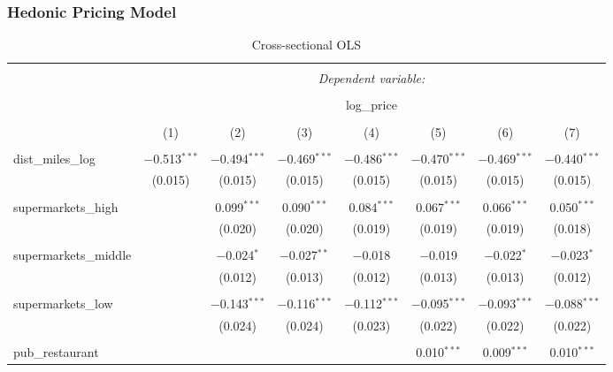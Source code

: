 \documentclass{article}
\begin{document}
\subsubsection{Hedonic Pricing Model} \label{subsubsection:result:hedonic}
\begin{table}[t] \centering 
  \caption{Cross-sectional OLS} 
  \label{table:hedonic} 
\small 
\begin{tabular}{@{\extracolsep{-10pt}}lccccccc} 
\\[-1.8ex]\hline 
\hline \\[-1.8ex] 
 & \multicolumn{7}{c}{\textit{Dependent variable:}} \\ 
\cline{2-8} 
\\[-1.8ex] & \multicolumn{7}{c}{log\_price} \\ 
\\[-1.8ex] & (1) & (2) & (3) & (4) & (5) & (6) & (7)\\ 
\hline \\[-1.8ex] 
 dist\_miles\_log & $-$0.513$^{***}$ & $-$0.494$^{***}$ & $-$0.469$^{***}$ & $-$0.486$^{***}$ & $-$0.470$^{***}$ & $-$0.469$^{***}$ & $-$0.440$^{***}$ \\ 
  & (0.015) & (0.015) & (0.015) & (0.015) & (0.015) & (0.015) & (0.015) \\ 
  & & & & & & & \\ 
 supermarkets\_high &  & 0.099$^{***}$ & 0.090$^{***}$ & 0.084$^{***}$ & 0.067$^{***}$ & 0.066$^{***}$ & 0.050$^{***}$ \\ 
  &  & (0.020) & (0.020) & (0.019) & (0.019) & (0.019) & (0.018) \\ 
  & & & & & & & \\ 
 supermarkets\_middle &  & $-$0.024$^{*}$ & $-$0.027$^{**}$ & $-$0.018 & $-$0.019 & $-$0.022$^{*}$ & $-$0.023$^{*}$ \\ 
  &  & (0.012) & (0.013) & (0.012) & (0.013) & (0.013) & (0.012) \\ 
  & & & & & & & \\ 
 supermarkets\_low &  & $-$0.143$^{***}$ & $-$0.116$^{***}$ & $-$0.112$^{***}$ & $-$0.095$^{***}$ & $-$0.093$^{***}$ & $-$0.088$^{***}$ \\ 
  &  & (0.024) & (0.024) & (0.023) & (0.022) & (0.022) & (0.022) \\ 
  & & & & & & & \\ 
 pub\_restaurant &  &  &  &  & 0.010$^{***}$ & 0.009$^{***}$ & 0.010$^{***}$ \\ 

\end{tabular}
\end{table}
\end{document}
